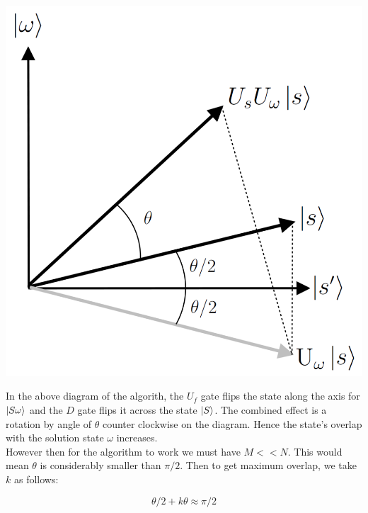 \documentclass{article}
\begin{document}
            {
            \centering
            \includegraphics[width = 8 cm]{image.png}\par
            }

            In the above diagram of the algorith, the $U_f$ gate flips the state along the axis for
            $\ket{S\omega}$ and the $D$ gate flips it across the state $\ket{S}$. The combined effect is 
            a rotation by angle of $\theta$ counter clockwise on the diagram. Hence the state's overlap
            with the solution state $\omega$ increases. \\

            However then for the algorithm to work we must have $M << N$. This would mean $\theta$ is 
            considerably smaller than $\pi/2$. Then to get maximum overlap, we take $k$ as follows:

            $$\theta/2 + k\theta \approx \pi/2$$
            
\end{document}
